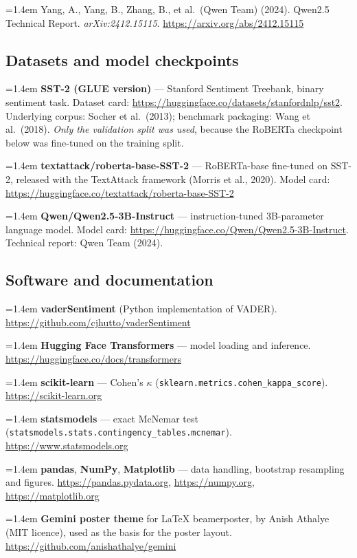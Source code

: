 \documentclass[11pt,a4paper]{article}
\newcommand{\refitem}[1]{\par\noindent\hangindent=1.4em\hangafter=1 #1\par\vspace{0.45em}}
\begin{document}
\refitem{Yang, A., Yang, B., Zhang, B., et al.\ (Qwen Team) (2024). Qwen2.5 Technical Report. \emph{arXiv:2412.15115}. \url{https://arxiv.org/abs/2412.15115}}

\subsection*{Datasets and model checkpoints}

\refitem{\textbf{SST-2 (GLUE version)} --- Stanford Sentiment Treebank, binary sentiment task. Dataset card: \url{https://huggingface.co/datasets/stanfordnlp/sst2}. Underlying corpus: Socher et al.\ (2013); benchmark packaging: Wang et al.\ (2018). \emph{Only the validation split was used}, because the RoBERTa checkpoint below was fine-tuned on the training split.}

\refitem{\textbf{textattack/roberta-base-SST-2} --- RoBERTa-base fine-tuned on SST-2, released with the TextAttack framework (Morris et al., 2020). Model card: \url{https://huggingface.co/textattack/roberta-base-SST-2}}

\refitem{\textbf{Qwen/Qwen2.5-3B-Instruct} --- instruction-tuned 3B-parameter language model. Model card: \url{https://huggingface.co/Qwen/Qwen2.5-3B-Instruct}. Technical report: Qwen Team (2024).}

\subsection*{Software and documentation}

\refitem{\textbf{vaderSentiment} (Python implementation of VADER). \url{https://github.com/cjhutto/vaderSentiment}}

\refitem{\textbf{Hugging Face Transformers} --- model loading and inference. \url{https://huggingface.co/docs/transformers}}

\refitem{\textbf{scikit-learn} --- Cohen's $\kappa$ (\texttt{sklearn.metrics.cohen\_kappa\_score}). \url{https://scikit-learn.org}}

\refitem{\textbf{statsmodels} --- exact McNemar test (\texttt{statsmodels.stats.contingency\_tables.mcnemar}). \url{https://www.statsmodels.org}}

\refitem{\textbf{pandas}, \textbf{NumPy}, \textbf{Matplotlib} --- data handling, bootstrap resampling and figures. \url{https://pandas.pydata.org}, \url{https://numpy.org}, \url{https://matplotlib.org}}

\refitem{\textbf{Gemini poster theme} for \LaTeX{} beamerposter, by Anish Athalye (MIT licence), used as the basis for the poster layout. \url{https://github.com/anishathalye/gemini}}
\end{document}
